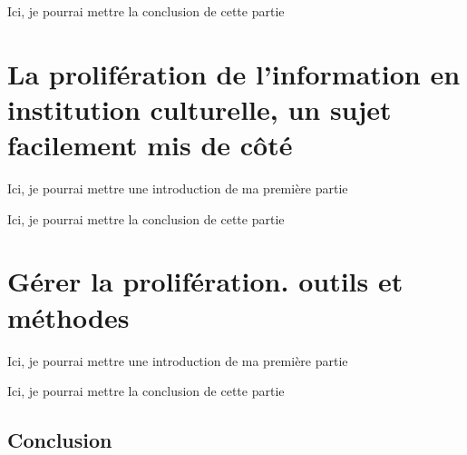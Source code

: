 \documentclass[12pt,twoside]{book}
\begin{document}



Ici, je pourrai mettre la conclusion de cette partie

%
%	
	
	\part{La prolifération de l’information en institution culturelle, un sujet facilement mis de côté}
	
	
	
	Ici, je pourrai mettre une introduction de ma première partie
	
	
	
	
	
	Ici, je pourrai mettre la conclusion de cette partie
	
		\part{Gérer la prolifération. outils et méthodes}
	
	
	
	Ici, je pourrai mettre une introduction de ma première partie
	
	
	
	
	
	Ici, je pourrai mettre la conclusion de cette partie
	
	
	\chapter*{Conclusion}
\newpage{\pagestyle{empty}\cleardoublepage}
	
\end{document}
